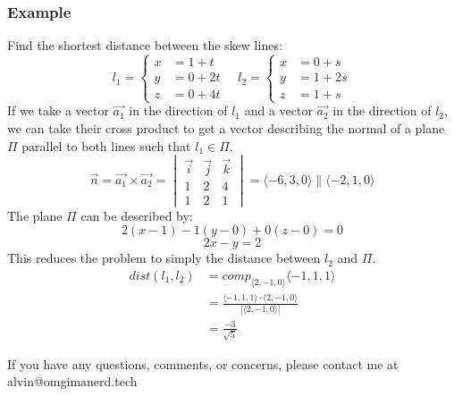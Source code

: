 \documentclass[letterpaper, 12pt]{math}
\begin{document}
\subsubsection*{Example}
Find the shortest distance between the skew lines:
\[ l_1 = \begin{cases}
  x &= 1+t \\
  y &= 0+2t \\
  z &= 0+4t
\end{cases} \quad l_2 = \begin{cases}
  x &= 0+s \\
  y &= 1+2s \\
  z &= 1+s
\end{cases} \]
If we take a vector \( \vec{a_1} \) in the direction of \( l_1 \) and a vector
\( \vec{a_2} \) in the direction of \( l_2 \), we can take their cross product
to get a vector describing the normal of a plane \( \Pi \) parallel to both
lines such that \( l_1\in\Pi \).
\[ \vec{n} = \vec{a_1}\times\vec{a_2} = \begin{vmatrix}
  \vec{i} & \vec{j} & \vec{k} \\
  1 & 2 & 4 \\
  1 & 2 & 1
\end{vmatrix} = \langle-6,3,0\rangle\parallel\langle-2,1,0\rangle \]
The plane \( \Pi \) can be described by:
\[ 2(x-1)-1(y-0)+0(z-0) = 0 \]
\[ 2x-y = 2 \]
This reduces the problem to simply the distance between \( l_2 \) and \( \Pi \).
\begin{align*}
  dist(l_1,l_2) &= comp_{\langle2,-1,0\rangle}\langle-1,1,1\rangle \\
  &= \frac{\langle-1,1,1\rangle\cdot\langle2,-1,0\rangle}
    {|\langle2,-1,0\rangle|} \\
  &= \frac{-3}{\sqrt{5}}
\end{align*}

\begin{center}
  If you have any questions, comments, or concerns, please contact me at
  alvin@omgimanerd.tech
\end{center}
\end{document}
